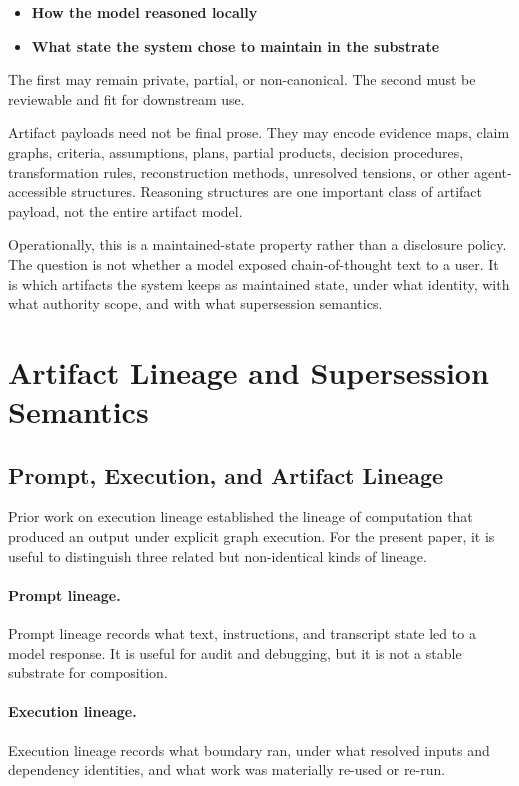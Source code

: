 \documentclass{article}
\begin{document}
\begin{itemize}
\item \textbf{How the model reasoned locally}
\item \textbf{What state the system chose to maintain in the substrate}
\end{itemize}

The first may remain private, partial, or non-canonical. The second must be reviewable and fit for downstream use.

Artifact payloads need not be final prose. They may encode evidence maps, claim graphs, criteria, assumptions, plans, partial products, decision procedures, transformation rules, reconstruction methods, unresolved tensions, or other agent-accessible structures. Reasoning structures are one important class of artifact payload, not the entire artifact model.

Operationally, this is a maintained-state property rather than a disclosure policy. The question is not whether a model exposed chain-of-thought text to a user. It is which artifacts the system keeps as maintained state, under what identity, with what authority scope, and with what supersession semantics.

\section{Artifact Lineage and Supersession Semantics}

\subsection{Prompt, Execution, and Artifact Lineage}

Prior work on execution lineage established the lineage of computation that produced an output under explicit graph execution. For the present paper, it is useful to distinguish three related but non-identical kinds of lineage.

\paragraph{Prompt lineage.} Prompt lineage records what text, instructions, and transcript state led to a model response. It is useful for audit and debugging, but it is not a stable substrate for composition.

\paragraph{Execution lineage.} Execution lineage records what boundary ran, under what resolved inputs and dependency identities, and what work was materially re-used or re-run.
\end{document}
